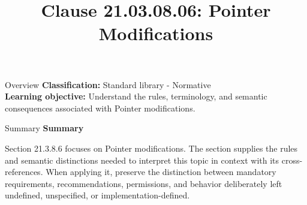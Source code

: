 \documentclass[10pt,letterpaper]{article}
\title{Clause 21.03.08.06: Pointer Modifications}
\author{}
\date{}
\begin{document}
\maketitle
\begin{CornellOverviewBox}{Overview}
\textbf{Classification:} Standard library - Normative\\[2pt]
\textbf{Learning objective:} Understand the rules, terminology, and semantic consequences associated with Pointer modifications.
\end{CornellOverviewBox}\begin{CornellSummaryBox}{Summary}
{\sffamily\bfseries\color{Accent} Summary}\par\vspace{3pt}Section 21.3.8.6 focuses on Pointer modifications. The section supplies the rules and semantic distinctions needed to interpret this topic in context with its cross-references. When applying it, preserve the distinction between mandatory requirements, recommendations, permissions, and behavior deliberately left undefined, unspecified, or implementation-defined.
\end{CornellSummaryBox}
\end{document}
